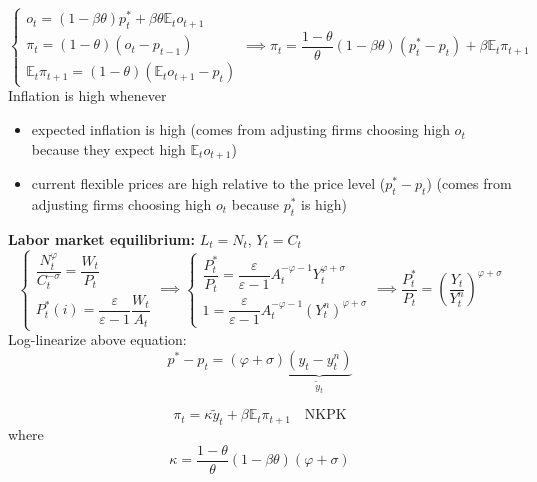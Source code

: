 \documentclass{article}
\begin{document}
\begin{equation*}
    \begin{cases}
        o_t=(1-\beta\theta)p_t^* + \beta\theta\mathbb{E}_to_{t+1} \\
        \pi_t = (1-\theta)(o_t-p_{t-1}) \\
        \mathbb{E}_t\pi_{t+1}=(1-\theta)(\mathbb{E}_to_{t+1}-p_t)
    \end{cases}
    \implies
    \pi_t=\frac{1-\theta}{\theta}(1-\beta\theta)(p_t^*-p_t)+\beta\mathbb{E}_t\pi_{t+1}
\end{equation*}
Inflation is high whenever
\begin{itemize}
    \item expected inflation is high (comes from adjusting firms choosing high $o_t$ because they expect high $\mathbb{E}_t o_{t+1}$)
    \item current flexible prices are high relative to the price level ($p_t^*-p_t$) (comes from adjusting firms choosing high $o_t$ because $p_t^*$ is high)
\end{itemize}

\textbf{Labor market equilibrium:} $L_t=N_t$, $Y_t=C_t$
\begin{equation*}
    \begin{cases}
        \dfrac{N_t^{\varphi}}{C_t^{-\sigma}}=\dfrac{W_t}{P_t} \\
        P_t^*(i)=\dfrac{\varepsilon}{\varepsilon-1}\dfrac{W_t}{A_t}
    \end{cases}
    \implies
    \begin{cases}
        \dfrac{P_t^*}{P_t}=\dfrac{\varepsilon}{\varepsilon-1}A_t^{-\varphi-1}Y_t^{\varphi+\sigma} \\
        1=\dfrac{\varepsilon}{\varepsilon-1}A_t^{-\varphi-1}(Y_t^n)^{\varphi+\sigma}
    \end{cases}
    \implies
    \frac{P_t^*}{P_t}=\left(\frac{Y_t}{Y_t^n}\right)^{\varphi+\sigma}
\end{equation*}
Log-linearize above equation:
\begin{equation*}
    p^*-p_t=(\varphi+\sigma)\underbrace{(y_t-y_t^n)}_{\widetilde{y}_t}
\end{equation*}

\begin{equation*}
    \pi_t=\kappa\widetilde{y}_t + \beta\mathbb{E}_t\pi_{t+1}\quad \textrm{NKPK}
\end{equation*}
where
\begin{equation*}
    \kappa=\frac{1-\theta}{\theta}(1-\beta\theta)(\varphi+\sigma)
\end{equation*}
\end{document}

